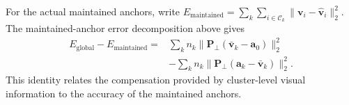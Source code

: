 For the actual maintained anchors, write
$E_{\mathrm{maintained}}
=\sum_k\sum_{i\in\mathcal{C}_k}
\|\mathbf{v}_i-\hat{\mathbf{v}}_i\|_2^2$.
The maintained-anchor error decomposition above gives
\begin{equation*}
\begin{aligned}
    E_{\mathrm{global}}-E_{\mathrm{maintained}}
    ={}&
    \sum_k n_k
      \|\mathbf{P}_{\perp}(\bar{\mathbf{v}}_k-\mathbf{a}_0)\|_2^2\\
    &-\sum_k n_k
      \|\mathbf{P}_{\perp}(\mathbf{a}_k-\bar{\mathbf{v}}_k)\|_2^2.
\end{aligned}
\end{equation*}
This identity relates the compensation provided by cluster-level
visual information to the accuracy of the maintained anchors.
